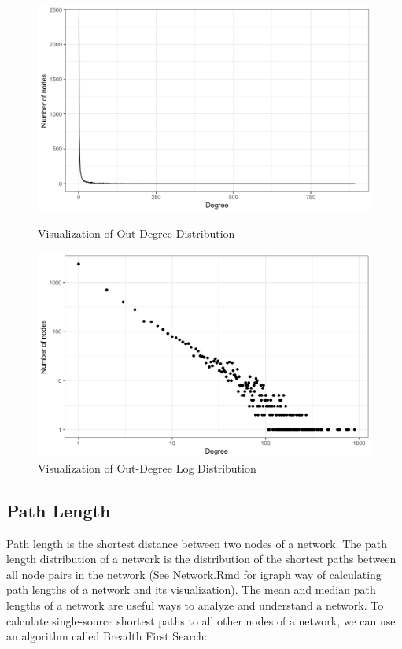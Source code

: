 \begin{figure}
\centering
\begin{minipage}{.5\textwidth}
  \centering
  \includegraphics[width=.9\linewidth]{figures/out-deg.png}
  \caption{Visualization of Out-Degree Distribution}
  \label{fig:out-deg}
\end{minipage}%
\begin{minipage}{.5\textwidth}
  \centering
  \includegraphics[width=.9\linewidth]{figures/out-deg-log.png}
  \caption{Visualization of Out-Degree Log Distribution}
  \label{fig:out-deg-log}
\end{minipage}
\end{figure}

\newpage
\subsection{Path Length}
Path length is the shortest distance between two nodes of a network. The path length distribution of a network is the distribution of the shortest paths between all node pairs in the network (See Network.Rmd for igraph way of calculating path lengths of a network and its visualization). The mean and median path lengths of a network are useful ways to analyze and understand a network. To calculate single-source shortest paths to all other nodes of a network, we can use an algorithm called Breadth First Search:
